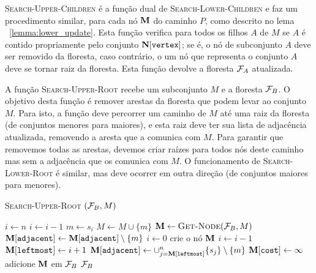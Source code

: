 \textsc{Search-Upper-Children} é a função dual de 
\textsc{Search-Lower-Children} e faz um procedimento similar, para 
cada nó $\mathbf M$ do caminho $P$, como descrito no lema 
~\ref{lemma:lower_update}. Esta função verifica para todos os filhos $A$
de $M$ se $A$ é contido propriamente pelo conjunto 
$\mathbf N[\texttt{vertex}]$; se é, o nó de subconjunto $A$ deve ser 
removido da floresta, caso contrário, o um nó que representa o conjunto 
$A$ deve se tornar raiz da floresta. Esta função devolve a floresta 
$\mathcal{F}_A$ atualizada.


A função \textsc{Search-Upper-Root} recebe um subconjunto $M$ e a 
floresta $\mathcal{F}_B$. O objetivo desta função é remover arestas da 
floresta que podem levar ao conjunto $M$. Para isto, a função deve 
percorrer um caminho de $M$ até uma raiz da floresta (de conjuntos 
menores para maiores), e esta raiz deve ter sua lista de adjacência 
atualizada, removendo a aresta que a comunica com $M$. Para garantir que 
removemos todas as arestas, devemos criar raízes para todos nós deste 
caminho mas sem a adjacência que os comunica com $M$. O funcionamento de 
\textsc{Search-Lower-Root} é similar, mas deve ocorrer em outra direção
(de conjuntos maiores para menores).

\begin{algorithm}[H]
\textsc{Search-Upper-Root} $(\mathcal{F}_B, M)$
\begin{algorithmic}[1]
    \State $i \gets n$
        \State $i \gets i - 1$
    \EndWhile
        \State $m \gets s_i$
        \State $M \gets M \cup \{m\}$
        \State $\mathbf M \gets {\normalfont\textsc{Get-Node}} (\mathcal{F}_B, M)$
            \State $\mathbf M[\texttt{adjacent}] \gets \mathbf M[\texttt{adjacent}] \setminus \{m\} $
            \State $i \gets 0$
        \Else
            \State crie o nó $\mathbf M$
                \State $i \gets i - 1$
            \EndWhile
            \State $\mathbf M[\texttt{leftmost}] \gets i + 1$
            \State $\mathbf M[\texttt{adjacent}] \gets \cup_{j = \mathbf M[\texttt{leftmost}]}^{n} \{s_j\} \setminus \{m\} $
            \State $\mathbf M[\texttt{cost}] \gets \infty$
            \State adicione $\mathbf M$ em $\mathcal{F}_B$
        \EndIf
        \Return $\mathcal{F}_B$
    \EndWhile
\end{algorithmic}
\end{algorithm}

